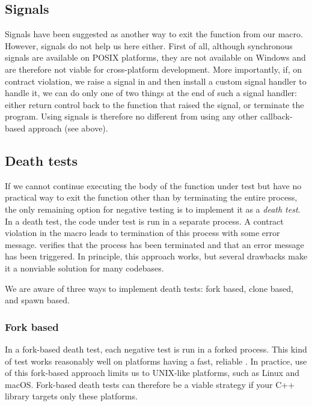 \subsection{Signals}

Signals have been suggested as another way to exit the function from our  macro. However, signals do not help us here either. First of all, although synchronous signals are available on POSIX platforms, they are not available on Windows and are therefore not viable for cross-platform development. More importantly, if, on contract violation, we raise a signal in  and then install a custom signal handler to handle it, we can do only one of two things at the end of such a signal handler: either return control back to the function that raised the signal, or terminate the program. Using signals is therefore no different from using any other callback-based approach (see above).

\subsection{Death tests}
\label{subsec:deathtests}

If we cannot continue executing the body of the function under test but have no practical way to exit the function other than by terminating the entire process, the only remaining option for negative testing is to implement it as a \emph{death test}. In a death test, the code under test is run in a separate process. A contract violation in the  macro leads to termination of this process with some error message.  verifies that the process has been terminated and that an error message has been triggered. In principle, this approach works, but several drawbacks make it a nonviable solution for many codebases.

We are aware of three ways to implement death tests: fork based, clone based, and spawn based.

\subsubsection{Fork based}

In a fork-based death test, each negative test is run in a forked process. This kind of test works reasonably well on platforms having a fast, reliable . In practice, use of this fork-based approach limits us to UNIX-like platforms, such as Linux and macOS. Fork-based death tests can therefore be a viable strategy if your C++ library targets only these platforms.

